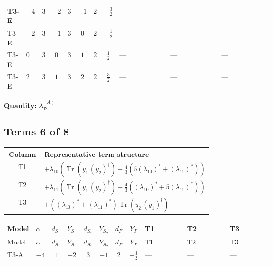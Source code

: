 \documentclass[8pt]{article}
\begin{document}
\begin{landscape}
\begin{longtable}{@{}llcccccc >{\raggedright\arraybackslash}p{0.21\linewidth} >{\raggedright\arraybackslash}p{0.21\linewidth} >{\raggedright\arraybackslash}p{0.21\linewidth}@{}}
\midrule
T3-E & $-4$ & $3$ & $-2$ & $3$ & $-1$ & $2$ & $-\frac{3}{2}$ & --- & --- & --- \\
\midrule
T3-E & $-2$ & $3$ & $-1$ & $3$ & $0$ & $2$ & $-\frac{1}{2}$ & --- & --- & --- \\
\midrule
T3-E & $0$ & $3$ & $0$ & $3$ & $1$ & $2$ & $\frac{1}{2}$ & --- & --- & --- \\
\midrule
T3-E & $2$ & $3$ & $1$ & $3$ & $2$ & $2$ & $\frac{3}{2}$ & --- & --- & --- \\
\midrule
\bottomrule
\end{longtable}
\clearpage
\noindent\textbf{Quantity: }$\lambda_{12}^{(A)}$\par\smallskip
\subsection*{Terms 6 of 8}
\begin{center}
\begin{tabular}{@{}c >{\raggedright\arraybackslash}p{0.82\linewidth}@{}}
\toprule
Column & Representative term structure \\
\midrule
T1 & \(\displaystyle +{\lambda_{10}} \left(\operatorname{Tr}\!\left({y_1}\,\left({y_2}\right)^{\dagger}\right)+\frac{4}{3} (5 \left({\lambda_{10}}\right)^{*}+\left({\lambda_{11}}\right)^{*})\right)\) \\
\midrule
T2 & \(\displaystyle +{\lambda_{11}} \left(\operatorname{Tr}\!\left({y_1}\,\left({y_2}\right)^{\dagger}\right)+\frac{4}{3} (\left({\lambda_{10}}\right)^{*}+5 \left({\lambda_{11}}\right)^{*})\right)\) \\
\midrule
T3 & \(\displaystyle +(\left({\lambda_{10}}\right)^{*}+\left({\lambda_{11}}\right)^{*}) \operatorname{Tr}\!\left({y_2}\,\left({y_1}\right)^{\dagger}\right)\) \\
\midrule
\bottomrule
\end{tabular}
\end{center}
\smallskip
\tiny
\begin{longtable}{@{}llcccccc >{\raggedright\arraybackslash}p{0.21\linewidth} >{\raggedright\arraybackslash}p{0.21\linewidth} >{\raggedright\arraybackslash}p{0.21\linewidth}@{}}
\toprule
Model & $\alpha$ & $d_{S_1}$ & $Y_{S_1}$ & $d_{S_2}$ & $Y_{S_2}$ & $d_F$ & $Y_F$ & T1 & T2 & T3 \\
\midrule
\endfirsthead
\toprule
Model & $\alpha$ & $d_{S_1}$ & $Y_{S_1}$ & $d_{S_2}$ & $Y_{S_2}$ & $d_F$ & $Y_F$ & T1 & T2 & T3 \\
\midrule
\endhead
T3-A & $-4$ & $1$ & $-2$ & $3$ & $-1$ & $2$ & $-\frac{3}{2}$ & --- & --- & --- \\

\end{longtable}
\end{landscape}
\end{document}

